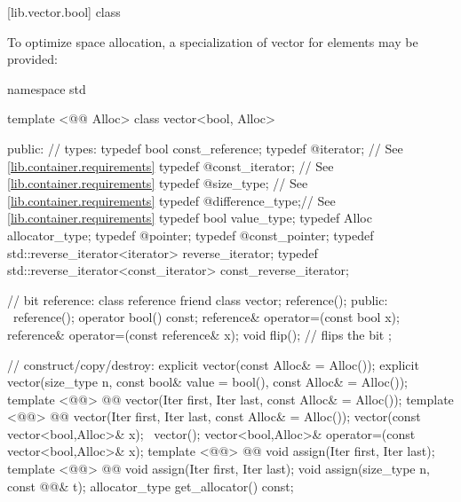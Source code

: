 \documentclass[american,twoside]{book}
\begin{document}
[lib.vector.bool]{ class }

\pnum
{}%
To optimize space allocation, a specialization of vector for
elements may be provided:

\begin{codeblock}
namespace std {
  template <@@ Alloc> class vector<bool, Alloc> {
  public:
    // types:
    typedef bool                                  const_reference;
    typedef @\impdef@                iterator;       // See \ref{lib.container.requirements}
    typedef @\impdef@                const_iterator; // See \ref{lib.container.requirements}
    typedef @\impdef@                size_type;      // See \ref{lib.container.requirements}
    typedef @\impdef@                difference_type;// See \ref{lib.container.requirements}
    typedef bool                                  value_type;
    typedef Alloc                                 allocator_type;
    typedef @\impdef@                pointer;
    typedef @\impdef@                const_pointer;
    typedef std::reverse_iterator<iterator>       reverse_iterator;
    typedef std::reverse_iterator<const_iterator> const_reverse_iterator;

    // bit reference:
    class reference {
     friend class vector;
     reference();
    public:
     ~reference();
      operator bool() const;
      reference& operator=(const bool x);
      reference& operator=(const reference& x);
      void flip();              // flips the bit
    };

    // construct/copy/destroy:
    explicit vector(const Alloc& = Alloc());
    explicit vector(size_type n, const bool& value = bool(),
                    const Alloc& = Alloc());
    template <@@>
      @@
      vector(Iter first, Iter last, const Alloc& = Alloc());
    template <@@>
      @@
      vector(Iter first, Iter last, const Alloc& = Alloc());
    vector(const vector<bool,Alloc>& x);
   ~vector();
    vector<bool,Alloc>& operator=(const vector<bool,Alloc>& x);
    template <@@>
      @@
      void assign(Iter first, Iter last);
    template <@@>
      @@
      void assign(Iter first, Iter last);
    void assign(size_type n, const @@& t);
    allocator_type get_allocator() const;

}}
\end{codeblock}
\end{document}
